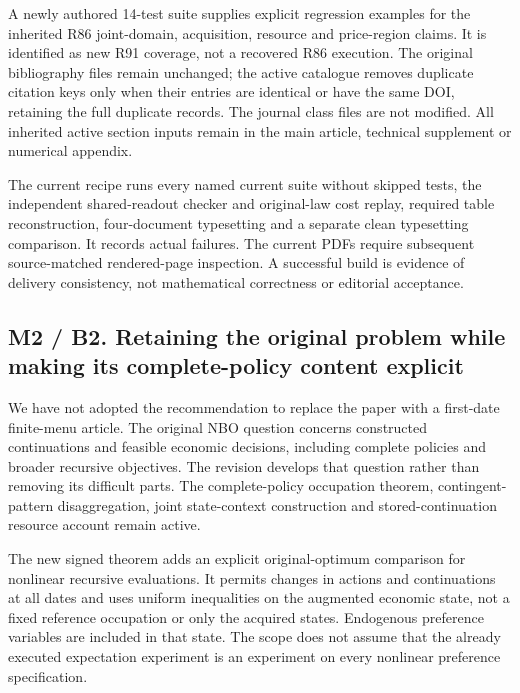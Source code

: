 A newly authored 14-test suite supplies explicit regression examples for
the inherited R86 joint-domain, acquisition, resource and price-region
claims. It is identified as new R91 coverage, not a recovered R86
execution. The original bibliography files remain unchanged; the active
catalogue removes duplicate citation keys only when their entries are
identical or have the same DOI, retaining the full duplicate records.
The journal class files are not modified. All inherited active section
inputs remain in the main article, technical supplement or numerical
appendix.

The current recipe runs every named current suite without skipped tests,
the independent shared-readout checker and original-law cost replay,
required table reconstruction, four-document typesetting and a separate
clean typesetting comparison. It records actual failures. The current
PDFs require subsequent source-matched rendered-page inspection. A
successful build is evidence of delivery consistency, not mathematical
correctness or editorial acceptance.

\hypertarget{m2-b2.-retaining-the-original-problem-while-making-its-complete-policy-content-explicit}{%
\subsection{M2 / B2. Retaining the original problem while making its
complete-policy content
explicit}\label{m2-b2.-retaining-the-original-problem-while-making-its-complete-policy-content-explicit}}

We have not adopted the recommendation to replace the paper with a
first-date finite-menu article. The original NBO question concerns
constructed continuations and feasible economic decisions, including
complete policies and broader recursive objectives. The revision
develops that question rather than removing its difficult parts. The
complete-policy occupation theorem, contingent-pattern disaggregation,
joint state-context construction and stored-continuation resource
account remain active.

The new signed theorem adds an explicit original-optimum comparison for
nonlinear recursive evaluations. It permits changes in actions and
continuations at all dates and uses uniform inequalities on the
augmented economic state, not a fixed reference occupation or only the
acquired states. Endogenous preference variables are included in that
state. The scope does not assume that the already executed expectation
experiment is an experiment on every nonlinear preference specification.

